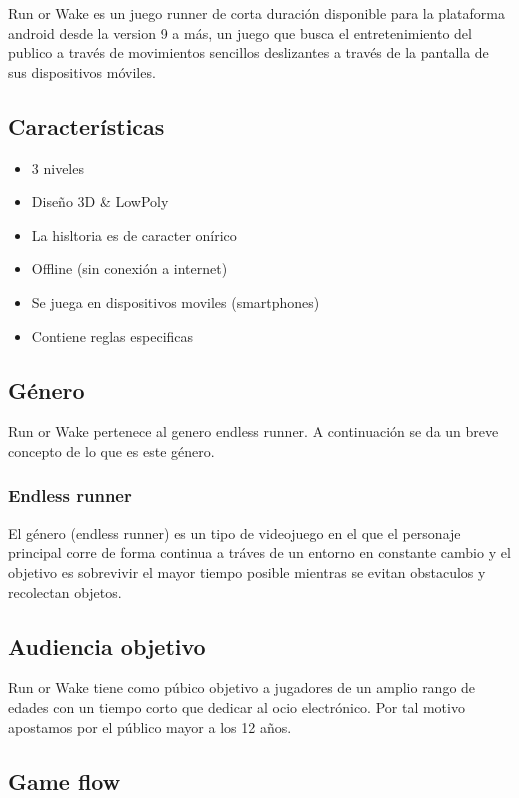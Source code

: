 Run or Wake es un juego runner de corta duración disponible para la plataforma android desde la
version 9 a más, un juego que busca el entretenimiento del publico a través de
movimientos sencillos deslizantes a través de la pantalla de sus dispositivos
móviles.

\subsection{Características}

\begin{itemize}
	\item 3 niveles
	\item Diseño 3D \& LowPoly
	\item La hisltoria es de caracter onírico
	\item Offline (sin conexión a internet)
	\item Se juega en dispositivos moviles (smartphones)
	\item Contiene reglas especificas
\end{itemize}

\subsection{Género}

Run or Wake pertenece al genero endless runner. A continuación se
da un breve concepto de lo que es este género.

\subsubsection{ Endless runner}
El género (endless runner) es un tipo de videojuego en el que el
personaje principal corre de forma continua a tráves de un entorno
en constante cambio y el objetivo es sobrevivir el mayor tiempo
posible mientras se evitan obstaculos y recolectan objetos.

\subsection{Audiencia objetivo}

Run or Wake tiene como púbico objetivo a jugadores de un amplio rango
de edades con un tiempo corto que dedicar al ocio electrónico. Por tal
motivo apostamos por el público mayor a los 12 años.

\subsection{Game flow}

